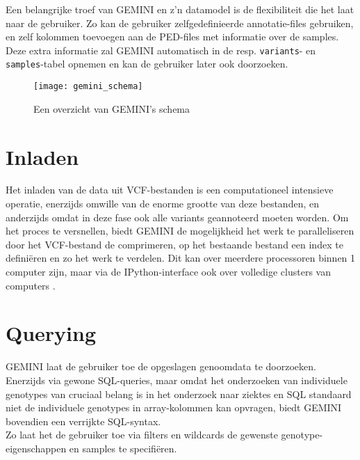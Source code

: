 Een belangrijke troef van GEMINI en z'n datamodel is de flexibiliteit die het laat naar de gebruiker. Zo kan de gebruiker zelfgedefinieerde annotatie-files gebruiken, en zelf kolommen toevoegen aan de PED-files met informatie over de samples. Deze extra informatie zal GEMINI automatisch in de resp. \texttt{variants}- en \texttt{samples}-tabel opnemen en kan de gebruiker later ook doorzoeken.

\begin{figure}[h]
\texttt{[image: gemini\_schema]}
\caption{Een overzicht van GEMINI's schema}
\label{gemini_schema_pic}
\end{figure}

\section{Inladen}
Het inladen van de data uit VCF-bestanden is een computationeel intensieve operatie, enerzijds omwille van de enorme grootte van deze bestanden, en anderzijds omdat in deze fase ook alle variants geannoteerd moeten worden. Om het proces te versnellen, biedt GEMINI de mogelijkheid het werk te paralleliseren door het VCF-bestand de comprimeren, op het bestaande bestand een index te defini\"eren en zo het werk te verdelen. Dit kan over meerdere processoren binnen 1 computer zijn, maar via de IPython-interface ook over volledige clusters van computers \cite{PER-GRA:2007}.\\

\section{Querying}

GEMINI laat de gebruiker toe de opgeslagen genoomdata te doorzoeken. Enerzijds via gewone SQL-queries, maar omdat het onderzoeken van individuele genotypes van cruciaal belang is in het onderzoek naar ziektes en SQL standaard niet de individuele genotypes in array-kolommen kan opvragen, biedt GEMINI bovendien een verrijkte SQL-syntax.\\
Zo laat het de gebruiker toe via filters en wildcards de gewenste genotype-eigenschappen en samples te specifi\"eren.

